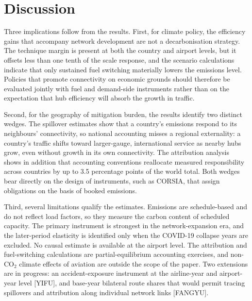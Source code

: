 \documentclass[12pt]{article}
\begin{document}
\section{Discussion}
Three implications follow from the results. First, for climate policy, the
efficiency gains that accompany network development are not a
decarbonisation strategy. The technique margin is present at both the
country and airport levels, but it offsets less than one tenth of the scale
response, and the scenario calculations indicate that only sustained fuel
switching materially lowers the emissions level. Policies that promote
connectivity on economic grounds should therefore be evaluated jointly with
fuel and demand-side instruments rather than on the expectation that hub
efficiency will absorb the growth in traffic.

Second, for the geography of mitigation burden, the results identify two
distinct wedges. The spillover estimates show that a country's emissions
respond to its neighbours' connectivity, so national accounting misses a
regional externality: a country's traffic shifts toward larger-gauge,
international service as nearby hubs grow, even without growth in its own
connectivity. The attribution analysis shows in addition that accounting
conventions reallocate measured responsibility across countries by up to
3.5 percentage points of the world total. Both wedges bear directly on the
design of instruments, such as CORSIA, that assign obligations on the basis
of booked emissions.

Third, several limitations qualify the estimates. Emissions are
schedule-based and do not reflect load factors, so they measure the carbon
content of scheduled capacity. The primary instrument is strongest in the
network-expansion era, and the later-period elasticity is identified only
when the COVID-19 collapse years are excluded. No causal estimate is
available at the airport level. The
attribution and fuel-switching calculations are partial-equilibrium
accounting exercises, and non-CO$_2$ climate effects of aviation are
outside the scope of the paper. Two extensions are in progress: an
accident-exposure instrument at the airline-year and airport-year level
[YIFU], and base-year bilateral route shares that would permit tracing
spillovers and attribution along individual network links [FANGYU].

\appendix
\end{document}
